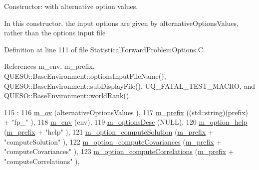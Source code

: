 Constructor\-: with alternative option values. 

In this constructor, the input options are given by {\ttfamily alternative\-Options\-Values}, rather than the options input file 

Definition at line 111 of file Statistical\-Forward\-Problem\-Options.\-C.



References m\-\_\-env, m\-\_\-prefix, Q\-U\-E\-S\-O\-::\-Base\-Environment\-::options\-Input\-File\-Name(), Q\-U\-E\-S\-O\-::\-Base\-Environment\-::sub\-Display\-File(), U\-Q\-\_\-\-F\-A\-T\-A\-L\-\_\-\-T\-E\-S\-T\-\_\-\-M\-A\-C\-R\-O, and Q\-U\-E\-S\-O\-::\-Base\-Environment\-::world\-Rank().


\begin{DoxyCode}
115   :
116   \hyperlink{class_q_u_e_s_o_1_1_statistical_forward_problem_options_a87ad4acd32801ea3edd5e65ffb093dbf}{m\_ov}                         (alternativeOptionsValues         ),
117   \hyperlink{class_q_u_e_s_o_1_1_statistical_forward_problem_options_adc3ea162cb9889b19128686aa657ab30}{m\_prefix}                     ((std::string)(prefix) + \textcolor{stringliteral}{"fp\_"}    ),
118   \hyperlink{class_q_u_e_s_o_1_1_statistical_forward_problem_options_a14f437399d668fac2aac5861bd6f39ca}{m\_env}                        (env),
119   \hyperlink{class_q_u_e_s_o_1_1_statistical_forward_problem_options_a8e7a0bd5657edc636cddd2f377d09501}{m\_optionsDesc}                (NULL),
120   \hyperlink{class_q_u_e_s_o_1_1_statistical_forward_problem_options_a6a48a27ad2c386feb7807e0623573fc5}{m\_option\_help}                (\hyperlink{class_q_u_e_s_o_1_1_statistical_forward_problem_options_adc3ea162cb9889b19128686aa657ab30}{m\_prefix} + \textcolor{stringliteral}{"help"}                ),
121   \hyperlink{class_q_u_e_s_o_1_1_statistical_forward_problem_options_a5e7c8a8383bb80a98ab4c271748e0d00}{m\_option\_computeSolution}     (\hyperlink{class_q_u_e_s_o_1_1_statistical_forward_problem_options_adc3ea162cb9889b19128686aa657ab30}{m\_prefix} + \textcolor{stringliteral}{"computeSolution"}     ),
122   \hyperlink{class_q_u_e_s_o_1_1_statistical_forward_problem_options_ad3f809f0695c126956afd86e07f77bc4}{m\_option\_computeCovariances}  (\hyperlink{class_q_u_e_s_o_1_1_statistical_forward_problem_options_adc3ea162cb9889b19128686aa657ab30}{m\_prefix} + \textcolor{stringliteral}{"computeCovariances"}  ),
123   \hyperlink{class_q_u_e_s_o_1_1_statistical_forward_problem_options_ad712823b5b7b3ce5c76a793a531f0f80}{m\_option\_computeCorrelations} (\hyperlink{class_q_u_e_s_o_1_1_statistical_forward_problem_options_adc3ea162cb9889b19128686aa657ab30}{m\_prefix} + \textcolor{stringliteral}{"computeCorrelations"} ),

\end{DoxyCode}
